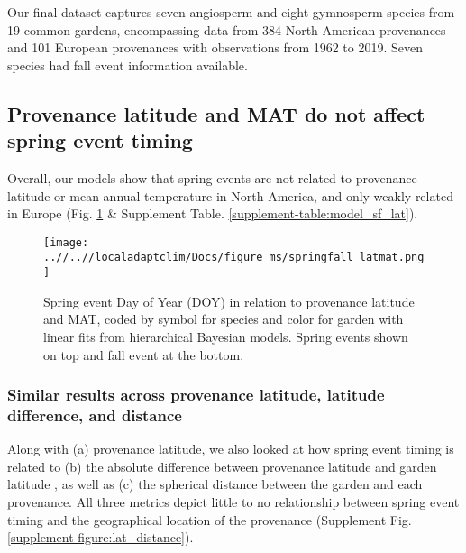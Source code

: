 \documentclass{article}
\begin{document}

Our final dataset captures seven angiosperm and eight gymnosperm species from 19 common gardens, encompassing data from 384 North American provenances and 101 European provenances with observations from 1962 to 2019. Seven species had fall event information available. 
\\


\subsection{Provenance latitude and MAT do not affect spring event timing}
Overall, our models show that spring events are not related to provenance latitude or mean annual temperature in North America, and only weakly related in Europe (Fig. \ref{figure:springfall_latmat} \& Supplement Table. \ref{supplement-table:model_sf_lat}).  %

\begin{figure}[!h] 
    \centering
 \texttt{[image: ..//..//localadaptclim/Docs/figure\_ms/springfall\_latmat.png]}
    \caption{Spring event Day of Year (DOY) in relation to provenance latitude and MAT, coded by symbol for species and color for garden with linear fits from hierarchical Bayesian models. Spring events shown on top and fall event at the bottom.}
    \label{figure:springfall_latmat}
\end{figure}


\newpage

\subsubsection {Similar results across provenance latitude, latitude difference, and distance}
Along with (a) provenance latitude, we also looked at how spring event timing is related to (b) the absolute difference between provenance latitude and garden latitude , as well as (c) the spherical distance between the garden and each provenance. All three metrics depict little to no relationship between spring event timing and the geographical location of the provenance (Supplement Fig.\ref{supplement-figure:lat_distance}).
\end{document}
